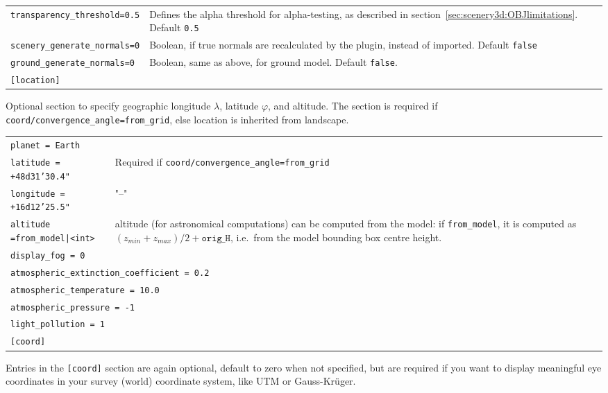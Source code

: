 \noindent%
\begin{tabularx}{\textwidth}{lX} 
\texttt{transparency\_threshold=0.5}  &Defines the alpha threshold for alpha-testing, as described in section~\ref{sec:scenery3d:OBJlimitations}. Default \texttt{0.5}\\
\texttt{scenery\_generate\_normals=0} &Boolean, if true normals are recalculated by the plugin, instead of imported. Default \texttt{false}\\
\texttt{ground\_generate\_normals=0}  &Boolean, same as above, for ground model. Default \texttt{false}.\\
\texttt{[location]}                   &
\end{tabularx}

\noindent Optional section to specify geographic longitude $\lambda$, latitude $\varphi$,
and altitude. The section is required if \verb|coord/convergence_angle=from_grid|, else
location is inherited from landscape.

\noindent%
\begin{tabularx}{\textwidth}{lX} 
\multicolumn{2}{l}{\texttt{planet = Earth}}\\
\texttt{latitude = +48d31'30.4"}      & Required if \texttt{coord/convergence\_angle=from\_grid}\\
\texttt{longitude = +16d12'25.5"}     & "--"\\
\texttt{altitude =from\_model|<int>}   &  altitude (for astronomical computations) can be computed from the model:  if
                                           \texttt{from\_model}, it is computed as $(z_{min}+z_{max})/2+\mathtt{orig\_H}$, 
                                            i.e.\ from the model bounding box centre height.\\
\multicolumn{2}{l}{\texttt{display\_fog = 0}}\\
\multicolumn{2}{l}{\texttt{atmospheric\_extinction\_coefficient = 0.2}}\\
\multicolumn{2}{l}{\texttt{atmospheric\_temperature = 10.0}}\\
\multicolumn{2}{l}{\texttt{atmospheric\_pressure = -1}}\\
\multicolumn{2}{l}{\texttt{light\_pollution = 1}}\\
\multicolumn{2}{l}{\texttt{[coord]}}\\
\end{tabularx}

\noindent Entries in the \verb|[coord]| section are again optional,
default to zero when not specified, but are required if you want to
display meaningful eye coordinates in your survey (world) coordinate
system, like UTM or Gauss-Kr\"uger.

